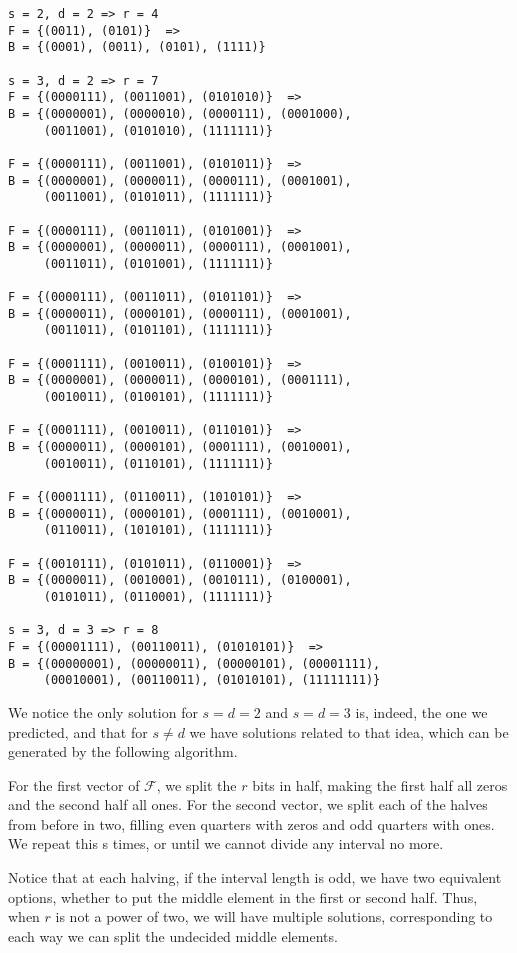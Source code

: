 \documentclass[11pt]{llncs}
\begin{document}
\begin{lstlisting}[basicstyle=\ttfamily]
s = 2, d = 2 => r = 4
F = {(0011), (0101)}  =>
B = {(0001), (0011), (0101), (1111)}

s = 3, d = 2 => r = 7
F = {(0000111), (0011001), (0101010)}  => 
B = {(0000001), (0000010), (0000111), (0001000),
     (0011001), (0101010), (1111111)}
     
F = {(0000111), (0011001), (0101011)}  =>
B = {(0000001), (0000011), (0000111), (0001001),
     (0011001), (0101011), (1111111)}

F = {(0000111), (0011011), (0101001)}  =>
B = {(0000001), (0000011), (0000111), (0001001),
     (0011011), (0101001), (1111111)}
     
F = {(0000111), (0011011), (0101101)}  => 
B = {(0000011), (0000101), (0000111), (0001001),
     (0011011), (0101101), (1111111)}

F = {(0001111), (0010011), (0100101)}  =>
B = {(0000001), (0000011), (0000101), (0001111),
     (0010011), (0100101), (1111111)}

F = {(0001111), (0010011), (0110101)}  =>
B = {(0000011), (0000101), (0001111), (0010001),
     (0010011), (0110101), (1111111)}

F = {(0001111), (0110011), (1010101)}  =>
B = {(0000011), (0000101), (0001111), (0010001),
     (0110011), (1010101), (1111111)}

F = {(0010111), (0101011), (0110001)}  =>
B = {(0000011), (0010001), (0010111), (0100001),
     (0101011), (0110001), (1111111)}

s = 3, d = 3 => r = 8
F = {(00001111), (00110011), (01010101)}  =>
B = {(00000001), (00000011), (00000101), (00001111),
     (00010001), (00110011), (01010101), (11111111)}
\end{lstlisting}

We notice the only solution for $s=d=2$ and $s=d=3$ is, indeed, the one we predicted, and that for $s \neq d$ we have solutions related to that idea, which can be generated by the following algorithm.

For the first vector of $\mathcal{F}$, we split the $r$ bits in half, making the first half all zeros and the second half all ones. For the second vector, we split each of the halves from before in two, filling even quarters with zeros and odd quarters with ones. We repeat this s times, or until we cannot divide any interval no more.

Notice that at each halving, if the interval length is odd, we have two equivalent options, whether to put the middle element in the first or second half. Thus, when $r$ is not a power of two, we will have multiple solutions, corresponding to each way we can split the undecided middle elements.
\end{document}
